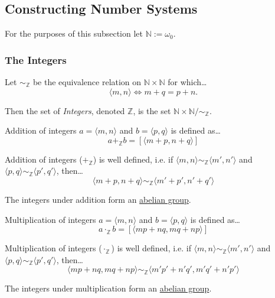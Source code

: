 \subsection{Constructing Number Systems}\label{numberconstructions}

For the purposes of this subsection let $\mathbb{N} := \omega_0$.

\subsubsection{The Integers}\label{integers}

Let $\sim_{\mathbb{Z}}$ be the equivalence relation on $\mathbb{N} \times \mathbb{N}$ for which\dots
$$\langle m,n \rangle \Leftrightarrow m+q=p+n.$$

\noindent Then the set of \emph{Integers}, denoted $\mathbb{Z}$, is the set $\mathbb{N} \times \mathbb{N} / \sim_{\mathbb{Z}}.$\newline

\noindent Addition of integers $a = \langle m, n \rangle$ and $b = \langle p, q \rangle$ is defined as\dots
$$a +_{\mathbb{Z}} b = [\langle m+p, n+q \rangle]$$

\begin{lemma}
Addition of integers ($+_{\mathbb{Z}}$) is well defined, i.e. if $\langle m,n \rangle \sim_{\mathbb{Z}} \langle m',n' \rangle$ and $\langle p,q \rangle \sim_{\mathbb{Z}} \langle p',q' \rangle$, then\dots
$$\langle m + p, n + q \rangle \sim_{\mathbb{Z}} \langle m' + p', n' + q' \rangle$$
\end{lemma}

\noindent The integers under addition form an \hyperref[grouptheory]{abelian group}.\newline

\noindent Multiplication of integers $a = \langle m, n \rangle$ and $b = \langle p, q \rangle$ is defined as\dots
$$a \cdot_{\mathbb{Z}} b = [\langle mp + nq, mq + np \rangle]$$

\begin{lemma}
Multiplication of integers ($\cdot_{\mathbb{Z}}$) is well defined, i.e. if $\langle m,n \rangle \sim_{\mathbb{Z}} \langle m',n' \rangle$ and $\langle p,q \rangle \sim_{\mathbb{Z}} \langle p',q' \rangle$, then\dots
$$\langle mp+nq, mq+np \rangle \sim_{\mathbb{Z}} \langle m'p' + n'q', m'q' + n'p' \rangle$$
\end{lemma}

\noindent The integers under multiplication form an \hyperref[grouptheory]{abelian group}.\newline

